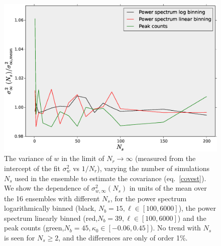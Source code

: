 \documentclass[reprint,aps,prd,superscriptaddress,showkeys,showpacs]{revtex4-1}
\begin{document}
\begin{figure}
\includegraphics[scale=0.3]{Figures/scaling_ns.eps}
\caption{The variance of $w$ in the limit of $N_r\rightarrow\infty$ (measured from the intercept of the fit $\sigma^2_w$ vs $1/N_r$),
  varying the number of simulations $N_s$ used in the ensemble to
  estimate the covariance (eq.~\ref{covest}). We show the dependence
  of $\sigma_{w,\infty}^2(N_s)$ in units of the mean over the 16 ensembles with different $N_s$, 
  for the power spectrum logarithmically binned (black, $N_b=15,\ell\in[100,6000]$), the power spectrum linearly binned (red,$N_b=39,\ell\in[100,6000]$) and the peak counts (green,$N_b=45,\kappa_0\in[-0.06,0.45]$).
  No trend with $N_s$ is seen for $N_s\geq 2$, and the differences are only of order 1\%.}
\label{wvar_ns}
\end{figure}
\end{document}
